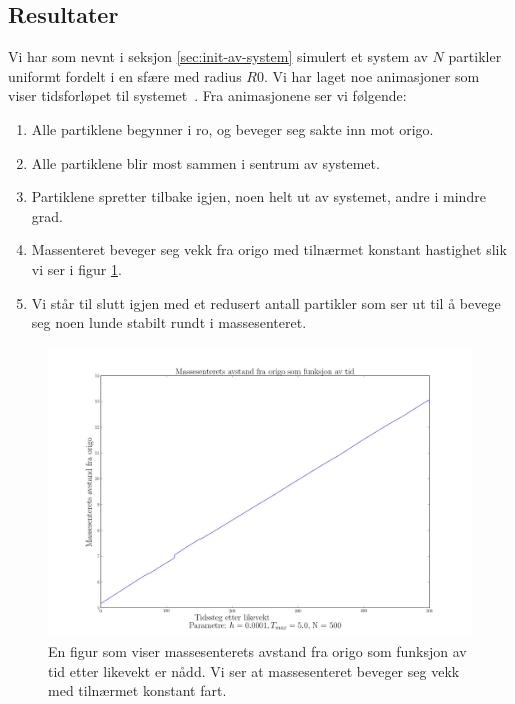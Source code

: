 \documentclass[11pt]{article}
\begin{document}

\cleardoublepage
\begin{multicols}{2}

\section{Resultater}
Vi har som nevnt i seksjon \ref{sec:init-av-system} simulert et system
av $N$ partikler uniformt fordelt i en sfære med radius $R0$. Vi har
laget noe animasjoner som viser tidsforløpet til
systemet~\cite[\texttt{project5/fig/}]{github-repo}. Fra animasjonene
ser vi følgende:
\begin{enumerate}
  \item Alle partiklene begynner i ro, og beveger seg sakte inn mot
    origo.
  \item Alle partiklene blir most sammen i sentrum av systemet.
  \item Partiklene spretter tilbake igjen, noen helt ut av systemet,
    andre i mindre grad.
  \item Massenteret beveger seg vekk fra origo med tilnærmet konstant
    hastighet slik vi ser i figur \ref{fig:massesenter}.
  \item Vi står til slutt igjen med et redusert antall partikler som
    ser ut til å bevege seg noen lunde stabilt rundt i massesenteret.
\end{enumerate}


\end{multicols}
\begin{figure}[ht!]
  \centering
  \includegraphics[width=\textwidth]{../fig/massesenter.png}
  \caption{\label{fig:massesenter} En figur som viser massesenterets
  avstand fra origo som funksjon av tid etter likevekt er nådd. Vi ser 
  at massesenteret beveger seg vekk med tilnærmet konstant fart.}
\end{figure}
\end{document}
